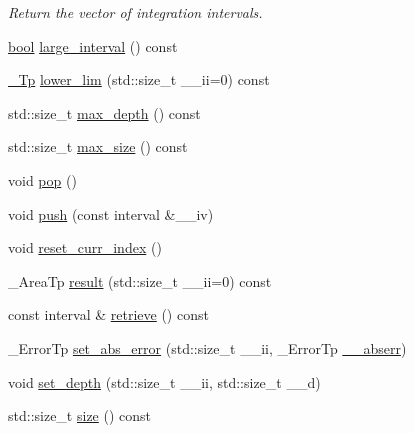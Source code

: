 \begin{DoxyCompactItemize}
\begin{DoxyCompactList}\small\item\em Return the vector of integration intervals. \end{DoxyCompactList}\item 
\hyperlink{namespace____gnu__cxx_ae83aca57f97767d5d09188718728a0ac}{bool} \hyperlink{class____gnu__cxx_1_1integration__workspace_a2e87749af2ee073b05442484ba9e7cf0}{large\+\_\+interval} () const
\item 
\hyperlink{namespace____gnu__cxx_a3b19a9c800ca194374ef9172290f7d79}{\+\_\+\+Tp} \hyperlink{class____gnu__cxx_1_1integration__workspace_af8ae8a6ff41b7d7b38aee63ccca6b458}{lower\+\_\+lim} (std\+::size\+\_\+t \+\_\+\+\_\+ii=0) const
\item 
std\+::size\+\_\+t \hyperlink{class____gnu__cxx_1_1integration__workspace_a18115495f63c8a3fc27205cad0ba8869}{max\+\_\+depth} () const
\item 
std\+::size\+\_\+t \hyperlink{class____gnu__cxx_1_1integration__workspace_a5e175d0bd16b95c51fd39606ce65c6fb}{max\+\_\+size} () const
\item 
void \hyperlink{class____gnu__cxx_1_1integration__workspace_a61069f2e98ee9e8b7cfcb88a02bc28ff}{pop} ()
\item 
void \hyperlink{class____gnu__cxx_1_1integration__workspace_a3d4ccc05a0cc0a2cda9cf2a5243b804d}{push} (const interval \&\+\_\+\+\_\+iv)
\item 
void \hyperlink{class____gnu__cxx_1_1integration__workspace_a3e86f552adb2892e7a771fa502174be3}{reset\+\_\+curr\+\_\+index} ()
\item 
\+\_\+\+Area\+Tp \hyperlink{class____gnu__cxx_1_1integration__workspace_a5b69a915d7023ea631a2e8a09a3a7e2e}{result} (std\+::size\+\_\+t \+\_\+\+\_\+ii=0) const
\item 
const interval \& \hyperlink{class____gnu__cxx_1_1integration__workspace_a1959842775432dfdeecc039c38ef838d}{retrieve} () const
\item 
\+\_\+\+Error\+Tp \hyperlink{class____gnu__cxx_1_1integration__workspace_a5e9f3a139e92add918968c6364e4a2b2}{set\+\_\+abs\+\_\+error} (std\+::size\+\_\+t \+\_\+\+\_\+ii, \+\_\+\+Error\+Tp \hyperlink{namespace____gnu__cxx_a72f736cff127f1574e91a301de9e074b}{\+\_\+\+\_\+abserr})
\item 
void \hyperlink{class____gnu__cxx_1_1integration__workspace_a16ba1aa9ba732eefd080784a305b1b82}{set\+\_\+depth} (std\+::size\+\_\+t \+\_\+\+\_\+ii, std\+::size\+\_\+t \+\_\+\+\_\+d)
\item 
std\+::size\+\_\+t \hyperlink{class____gnu__cxx_1_1integration__workspace_a3672c20ecc83962eca5bad7893437b6e}{size} () const

\end{DoxyCompactItemize}
